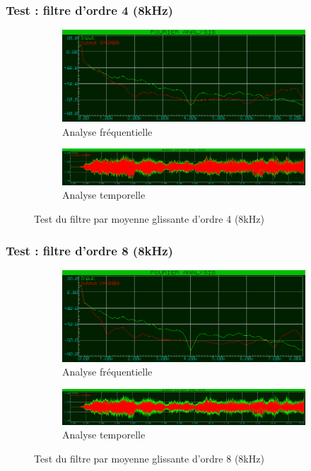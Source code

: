 \documentclass{article}
\begin{document}
    \subsubsection{Test : filtre d'ordre 4 (8kHz)}
    \begin{figure}[H]
        \centering
        \begin{subfigure}[b]{\textwidth}
            \centering
            \includegraphics[width=.6\textwidth]{./images/spectrum_mov_avg_4_8k.png}
            \caption{Analyse fréquentielle}
        \end{subfigure}
        \begin{subfigure}[b]{\textwidth}
            \centering
            \includegraphics[width=\textwidth]{./images/out_mov_avg_4_8k.png}
            \caption{Analyse temporelle}
        \end{subfigure}
        \caption{Test du filtre par moyenne glissante d'ordre 4 (8kHz)}
    \end{figure}

    \subsubsection{Test : filtre d'ordre 8 (8kHz)}
    \begin{figure}[H]
        \centering
        \begin{subfigure}[b]{\textwidth}
            \centering
            \includegraphics[width=.6\textwidth]{./images/spectrum_mov_avg_8_8k.png}
            \caption{Analyse fréquentielle}
        \end{subfigure}
        \begin{subfigure}[b]{\textwidth}
            \centering
            \includegraphics[width=\textwidth]{./images/out_mov_avg_8_8k.png}
            \caption{Analyse temporelle}
        \end{subfigure}
        \caption{Test du filtre par moyenne glissante d'ordre 8 (8kHz)}
    \end{figure}
\end{document}
